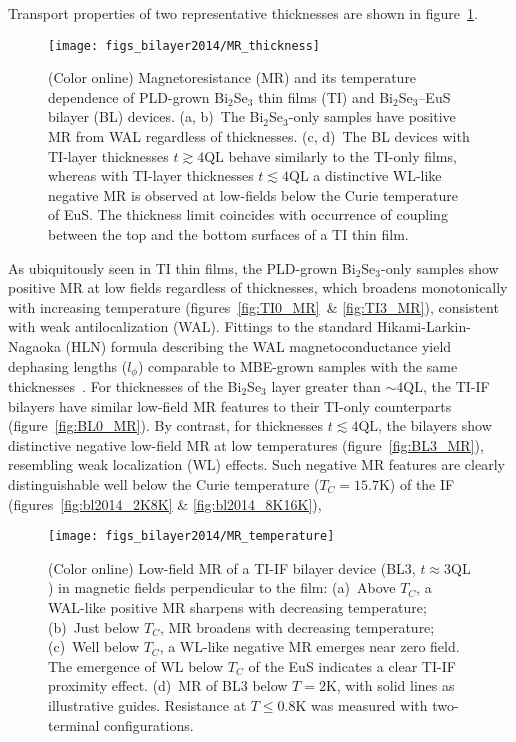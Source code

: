Transport properties of two representative thicknesses are shown in figure~\ref{fig:bl2014_MR_thickness}. %
%
\begin{figure}[h]%
\centering%
\subfloat{\label{fig:TI0_MR}}%
\subfloat{\label{fig:TI3_MR}}%
\subfloat{\label{fig:BL0_MR}}%
\subfloat{\label{fig:BL3_MR}}%
\texttt{[image: figs\_bilayer2014/MR\_thickness]}%
\caption[Magnetoresistance of PLD-grown Bi$_2$Se$_3$ thin films and Bi$_2$Se$_3$--EuS bilayers]{(Color online) Magnetoresistance (MR) and its temperature dependence of PLD-grown Bi$_2$Se$_3$ thin films (TI) and Bi$_2$Se$_3$--EuS bilayer (BL) devices. (a, b)~The Bi$_2$Se$_3$-only samples have positive MR from WAL regardless of thicknesses. (c, d)~The BL devices with TI-layer thicknesses $t\gtrsim4\mathrm{QL}$ behave similarly to the TI-only films, whereas with TI-layer thicknesses $t\lesssim4\mathrm{QL}$ a distinctive WL-like negative MR is observed at low-fields below the Curie temperature of EuS. The thickness limit coincides with occurrence of coupling between the top and the bottom surfaces of a TI thin film.}%
\label{fig:bl2014_MR_thickness}%
\end{figure}%
%
As ubiquitously seen in TI thin films, the PLD-grown Bi$_2$Se$_3$-only samples show positive MR at low fields regardless of thicknesses, which broadens monotonically with increasing temperature (figures~\ref{fig:TI0_MR}~\& \ref{fig:TI3_MR}), consistent with weak antilocalization (WAL). Fittings to the standard Hikami-Larkin-Nagaoka (HLN) formula describing the WAL magnetoconductance\cite{WL_HLN, WL_Khmel, bergmann1984} yield dephasing lengths ($l_\phi$) comparable to MBE-grown samples with the same thicknesses~\cite{TI_WAL_thickness, zhangli2013}. For thicknesses of the Bi$_2$Se$_3$ layer greater than $\sim4\mathrm{QL}$, the TI-IF bilayers have similar low-field MR features to their TI-only counterparts (figure~\ref{fig:BL0_MR}). By contrast, for thicknesses $t\lesssim4\mathrm{QL}$, the bilayers show distinctive negative low-field MR at low temperatures (figure~\ref{fig:BL3_MR}), resembling weak localization (WL) effects. Such negative MR features are clearly distinguishable well below the Curie temperature ($T_C=15.7$K) of the IF (figures~\ref{fig:bl2014_2K8K} \& \ref{fig:bl2014_8K16K}), %
%
%
\begin{figure}[h]%
\centering%
\subfloat{\label{fig:bl2014_16K30K}}%
\subfloat{\label{fig:bl2014_8K16K}}%
\subfloat{\label{fig:bl2014_2K8K}}%
\subfloat{\label{fig:bl2014_He3}}%
\texttt{[image: figs\_bilayer2014/MR\_temperature]}%
\caption[Magnetoresistance of Bi$_2$Se$_3$--EuS bilayer in different temperature r\'egimes]{\label{fig:bl2014_MR_temperature}(Color online) Low-field MR of a TI-IF bilayer device (BL3, $t\approx3\mathrm{QL}$) in magnetic fields perpendicular to the film: (a)~Above $T_C$, a WAL-like positive MR sharpens with decreasing temperature; (b)~Just below $T_C$, MR broadens with decreasing temperature; (c)~Well below $T_C$, a WL-like negative MR emerges near zero field. The emergence of WL below $T_C$ of the EuS indicates a clear TI-IF proximity effect. (d)~MR of BL3 below $T=2$K, with solid lines as illustrative guides. Resistance at $T\leq0.8\mathrm{K}$ was measured with two-terminal configurations.}
\end{figure}%
